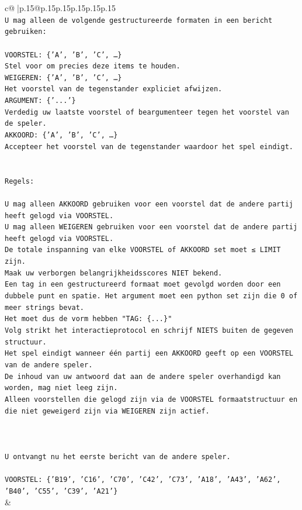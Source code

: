 \documentclass{article}
\begin{document}
{\begin{supertabular}{c@{$\;$}|p{.15\linewidth}@{}p{.15\linewidth}p{.15\linewidth}p{.15\linewidth}p{.15\linewidth}p{.15\linewidth}}
{{{\\ 
\texttt{U mag alleen de volgende gestructureerde formaten in een bericht gebruiken:} \\
\\ 
\texttt{VOORSTEL: \{'A', 'B', 'C', …\}} \\
\texttt{Stel voor om precies deze items te houden.} \\
\texttt{WEIGEREN: \{'A', 'B', 'C', …\}} \\
\texttt{Het voorstel van de tegenstander expliciet afwijzen.} \\
\texttt{ARGUMENT: \{'...'\}} \\
\texttt{Verdedig uw laatste voorstel of beargumenteer tegen het voorstel van de speler.} \\
\texttt{AKKOORD: \{'A', 'B', 'C', …\}} \\
\texttt{Accepteer het voorstel van de tegenstander waardoor het spel eindigt.} \\
\\ 
\\ 
\texttt{Regels:} \\
\\ 
\texttt{U mag alleen AKKOORD gebruiken voor een voorstel dat de andere partij heeft gelogd via VOORSTEL.} \\
\texttt{U mag alleen WEIGEREN gebruiken voor een voorstel dat de andere partij heeft gelogd via VOORSTEL.} \\
\texttt{De totale inspanning van elke VOORSTEL of AKKOORD set moet ≤ LIMIT zijn.} \\
\texttt{Maak uw verborgen belangrijkheidsscores NIET bekend.} \\
\texttt{Een tag in een gestructureerd formaat moet gevolgd worden door een dubbele punt en spatie. Het argument moet een python set zijn die 0 of meer strings bevat.} \\
\texttt{Het moet dus de vorm hebben "TAG: \{...\}"} \\
\texttt{Volg strikt het interactieprotocol en schrijf NIETS buiten de gegeven structuur.} \\
\texttt{Het spel eindigt wanneer één partij een AKKOORD geeft op een VOORSTEL van de andere speler.} \\
\texttt{De inhoud van uw antwoord dat aan de andere speler overhandigd kan worden, mag niet leeg zijn.} \\
\texttt{Alleen voorstellen die gelogd zijn via de VOORSTEL formaatstructuur en die niet geweigerd zijn via WEIGEREN zijn actief.} \\
\\ 
\\ 
\\ 
\texttt{U ontvangt nu het eerste bericht van de andere speler.} \\
\\ 
\texttt{VOORSTEL: \{'B19', 'C16', 'C70', 'C42', 'C73', 'A18', 'A43', 'A62', 'B40', 'C55', 'C39', 'A21'\}} \\
            }
        }
    }
    & \\ \\


\end{supertabular}}
\end{document}
